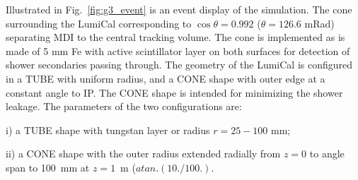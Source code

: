 Illustrated in Fig.~\ref{fig:g3_event} is an event display of the simulation.
The cone surrounding the LumiCal corresponding to $\cos\theta=0.992$ 
($\theta=126.6$ mRad) separating MDI to the central tracking volume.
The cone is implemented as is made of 5 mm Fe with active scintillator 
layer on both surfaces for detection of shower secondaries passing through. 
The geometry of the LumiCal is configured in a TUBE with uniform radius,
and a CONE shape with outer edge at a constant angle to IP.
The CONE shape is intended for minimizing the shower leakage.
The parameters of the two configurations are:
\begin{list}{}{\setlength{\leftmargin}{18pt}
		\setlength{\labelsep}{10pt}
		\setlength{\itemsep}{5pt}
		\setlength{\parsep}{0pt}}
	\item{i)}
	a TUBE shape with tungstan layer or radius $r=25-100$ mm;
	\item{ii)}
	a CONE shape with the outer radius extended radially from $z=0$
	to angle span to 100~mm at $z=1$~m ($atan.(10./100.)$.
\end{list}



